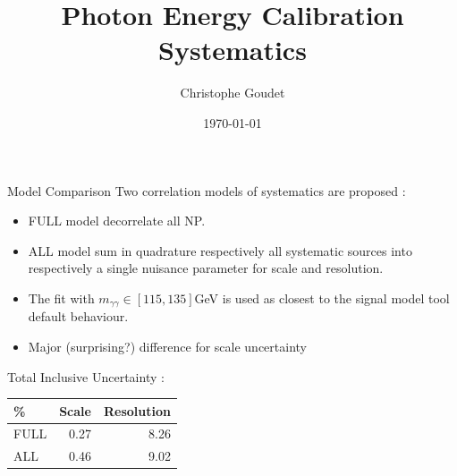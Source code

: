 \documentclass[a4paper]{beamer}
\title[$H\gamma\gamma$ couplings]{Photon Energy Calibration Systematics}
\author[Goudet]{Christophe Goudet}
\institute[LAL]{\texttt{[image: /home/goudet/Documents/LAL/ExternalPlot/LAL.jpg]} }
\date{\today}
\begin{document}
\transboxin
\begin{frame}
\maketitle
\end{frame}

%

\begin{frame}{Model Comparison}
    Two correlation models of systematics are proposed : 
  \begin{itemize}
  \item FULL model decorrelate all NP.
  \item ALL model sum in quadrature respectively all systematic sources into respectively a single nuisance parameter for scale and resolution.
  \item The fit with $m_{\gamma\gamma}\in[115,135]$GeV is used as closest to the signal model tool default behaviour.
  \item Major (surprising?) difference for scale uncertainty
  \end{itemize}
  \begin{center}
    Total Inclusive Uncertainty :\\
    \begin{tabular}{l|rr}
      \% & Scale & Resolution \\
      \hline
      FULL & 0.27 & 8.26 \\
      ALL & 0.46 & 9.02 \\
    \end{tabular}
  \end{center}
\end{frame}
\end{document}
